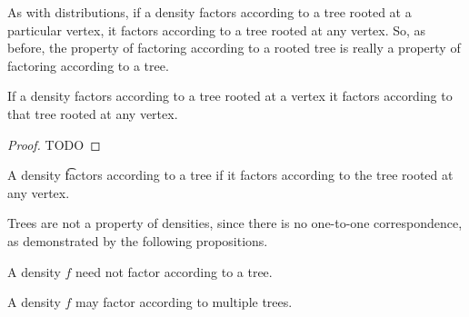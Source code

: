 
As with distributions, if a density factors according to a tree rooted at a particular vertex, it factors according to a tree rooted at any vertex.
So, as before, the property of factoring according to a rooted tree is really a property of factoring according to a tree.



\begin{prop}

If a density factors according to a tree rooted at a vertex it factors according to that tree rooted at any vertex.

\begin{proof}

TODO

\end{proof}

\end{prop}


A density \t{factors according to a tree} if it factors according to the tree rooted at any vertex.


Trees are not a property of densities,
since there is no one-to-one correspondence,
as demonstrated by the following propositions.


\begin{prop}
  A density $f$ need not factor according to a tree.
\end{prop}


\begin{prop}
  A density $f$ may factor according to multiple trees.
\end{prop}
\strats
